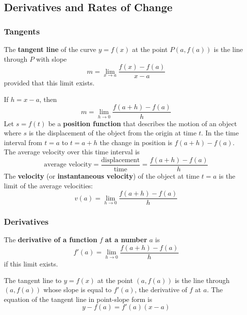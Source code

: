 \subsection{Derivatives and Rates of Change}

\subsubsection*{Tangents}
\begin{definition}
    The \textbf{tangent line} of the curve \(y=f(x)\) at the point
    \(P(a, f(a))\) is the line through \(P\) with slope
    \[m=\lim_{x\to a}\frac{f(x)-f(a)}{x-a}\]
    provided that this limit exists.
\end{definition}
If \(h=x-a\),
then
\[m=\lim_{h\to 0}\frac{f(a+h)-f(a)}{h}\]
Let \(s=f(t)\) be a \textbf{position function} that describes the motion of an
object where \(s\) is the displacement of the object from the origin at time
\(t\).
In the time interval from \(t=a\) to \(t=a+h\) the change in position is
\(f(a+h)-f(a)\).
The average velocity over this time interval is
\[\text{average velocity}
=\frac{\text{displacement}}{\text{time}}
=\frac{f(a+h)-f(a)}{h}\]
The \textbf{velocity} (or \textbf{instantaneous velocity}) of the object at
time \(t=a\) is the limit of the average velocities:
\[v(a)=\lim_{h\to 0}\frac{f(a+h)-f(a)}{h}\]

\subsubsection*{Derivatives}
\begin{definition}
    The \textbf{derivative of a function} \(f\) \textbf{at a number} \(a\) is
    \[f'(a)=\lim_{h\to 0}\frac{f(a+h)-f(a)}{h}\]
    if this limit exists.
\end{definition}
The tangent line to \(y=f(x)\) at the point \((a,f(a))\) is the line through
\((a,f(a))\) whose slope is equal to \(f'(a)\),
the derivative of \(f\) at \(a\).
The equation of the tangent line in point-slope form is
\[y-f(a)=f'(a)(x-a)\]

